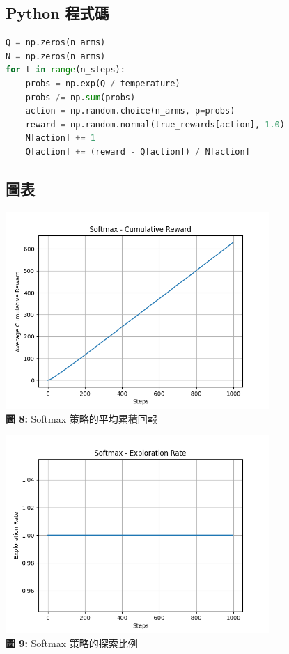 \documentclass{article}
\begin{document}
\subsection*{Python 程式碼}
\begin{lstlisting}[language=Python]
Q = np.zeros(n_arms)
N = np.zeros(n_arms)
for t in range(n_steps):
    probs = np.exp(Q / temperature)
    probs /= np.sum(probs)
    action = np.random.choice(n_arms, p=probs)
    reward = np.random.normal(true_rewards[action], 1.0)
    N[action] += 1
    Q[action] += (reward - Q[action]) / N[action]
\end{lstlisting}

\subsection*{圖表}
\begin{center}
\includegraphics[width=0.75\textwidth]{./plots/softmax_reward.png} \\
\textbf{圖 8:} Softmax 策略的平均累積回報
\end{center}

\begin{center}
\includegraphics[width=0.75\textwidth]{./plots/softmax_explore.png} \\
\textbf{圖 9:} Softmax 策略的探索比例
\end{center}
\end{document}
